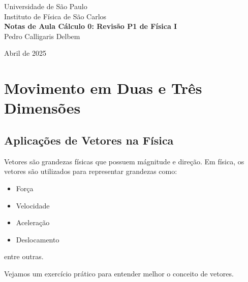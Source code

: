 \documentclass[12pt, a4paper]{article} %
\begin{document}
	
	\begin{titlepage}
		\begin{center}
\Huge{Universidade de São Paulo}\\
\large{Instituto de Física de São Carlos}\\
\vspace{20pt}
\vspace{200pt}
\textbf{Notas de Aula C\'alculo 0: Revis\~ao P1 de F\'isica I}\\
\vspace{2cm}
Pedro Calligaris Delbem\\
\end{center}

		\begin{center}
			\vspace{\fill}
	Abril de 2025	
		\end{center}
	\end{titlepage}

	\tableofcontents 
	\thispagestyle{empty}
	\newpage

\section{Movimento em Duas e Três Dimensões}

    \subsection{Aplica\c{c}\~oes de Vetores na F\'isica}

        Vetores s\~ao grandezas f\'isicas que possuem m\'agnitude e dire\c{c}\~ao.
        Em f\'isica, os vetores s\~ao utilizados para representar grandezas como:
        \begin{itemize}
            \item For\c{c}a
            \item Velocidade
            \item Acelera\c{c}\~ao
            \item Deslocamento
        \end{itemize}
        entre outras.

        Vejamos um exerc\'icio pr\'atico para entender melhor o conceito de vetores.
\end{document}
